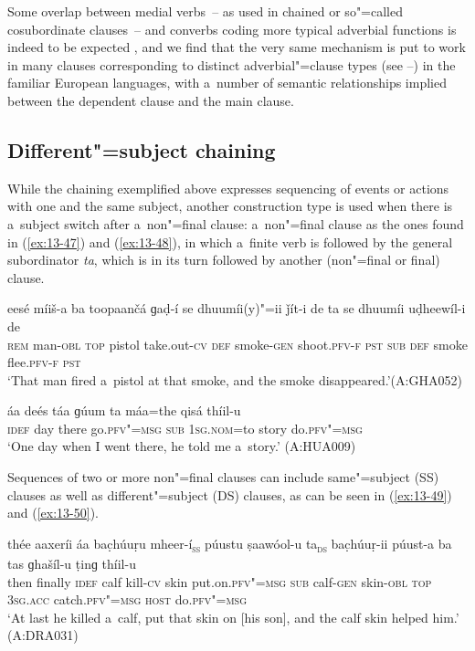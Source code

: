 Some overlap between medial verbs~-- as used in chained or so"=called cosubordinate clauses~-- and converbs coding more typical adverbial functions is indeed to be expected \citep[26]{haspelmath1995}, and we find that the very same mechanism is put to work in many clauses corresponding to distinct adverbial"=clause types (see --) in the familiar European languages, with a~number of semantic relationships implied between the dependent clause and the main clause. 


\subsection{Different"=subject chaining}
\label{subsec:13-3-2}


While the chaining exemplified above expresses sequencing of events or actions with one and the same subject, another construction type is used when there is a~subject switch after a~non"=final clause: a~non"=final clause as the ones found in (\ref{ex:13-47}) and (\ref{ex:13-48}), in which a~finite verb is followed by the general subordinator \textit{ta}, which is in its turn followed by another (non"=final or final) clause.

\begin{exe}
\ex
\label{ex:13-47}
\gll eesé míiš-a ba toopaančá ɡaḍ-í {\ob}se dhuumíi(y)"=ii ǰít-i de ta{\cb} se dhuumíi uḍheewíl-i de \\
\textsc{rem} man-\textsc{obl} \textsc{top} pistol take.out-\textsc{cv} \textsc{def}  smoke-\textsc{gen} shoot.\textsc{pfv-f} \textsc{pst} \textsc{sub} \textsc{def} smoke flee.\textsc{pfv-f} \textsc{pst} \\
\glt `That man fired a~pistol at that smoke, and the smoke disappeared.'\newline (A:GHA052)

\ex
\label{ex:13-48}
\gll {\ob}áa deés táa ɡúum ta{\cb} máa=the qisá thíil-u \\
\textsc{idef} day there go.\textsc{pfv"=msg } \textsc{sub} \textsc{1sg.nom}=to story do.\textsc{pfv"=msg}  \\
\glt `One day when I went there, he told me a~story.' (A:HUA009) 
\end{exe}

Sequences of two or more non"=final clauses can include same"=subject (SS) clauses as well as different"=subject (DS) clauses, as can be seen in (\ref{ex:13-49}) and (\ref{ex:13-50}).

\ea
\label{ex:13-49}
\gll thée aaxeríi {\ob}áa bac̣húuṛu mheer-í{\cb}\textsc{\textsubscript{\upshape ss}} {\ob}púustu ṣaawóol-u ta{\cb}\textsc{\textsubscript{\upshape ds}} bac̣húuṛ-ii púust-a ba tas ɡhašíl-u ṭinɡ thíil-u \\
then finally \textsc{idef} calf kill-\textsc{cv}  skin  put.on.\textsc{pfv"=msg} \textsc{sub} calf-\textsc{gen} skin-\textsc{obl} \textsc{top} \textsc{3sg.acc}
catch.\textsc{pfv"=msg} \textsc{host} do.\textsc{pfv"=msg} \\
\glt `At last he killed a~calf, put that skin on [his son], and the calf skin helped him.' (A:DRA031)

